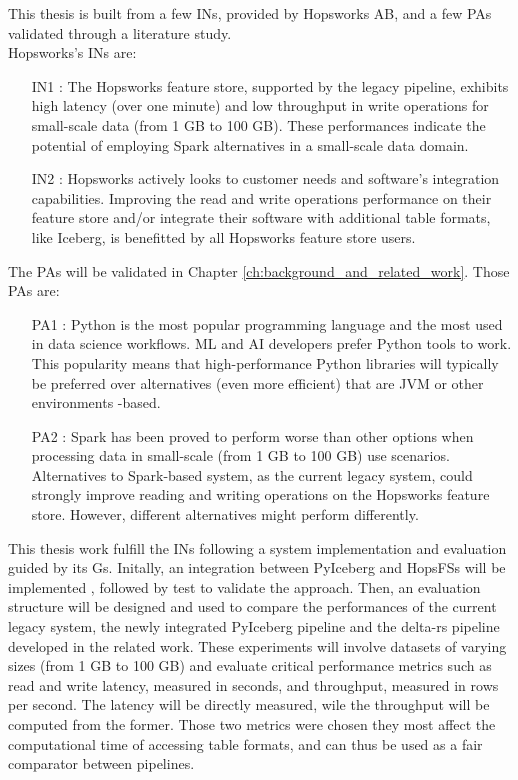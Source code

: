 This thesis is built from a few \glspl{IN}, provided by Hopsworks AB, and a few \glspl{PA} validated through a literature study. \\ Hopsworks's \glspl{IN} are:
\begin{itemize}
    \item[IN1 :] The Hopsworks feature store, supported by the legacy pipeline, exhibits high latency (over one minute) and low throughput in write operations for small-scale data (from 1 GB to 100 GB). These performances indicate the potential of employing Spark alternatives in a small-scale data domain.
    \item[IN2 :] Hopsworks actively looks to customer needs and software's integration capabilities. Improving the read and write operations performance on their feature store and/or integrate their software with additional table formats, like Iceberg, is benefitted by all Hopsworks feature store users.
\end{itemize}
The \glspl{PA} will be validated in Chapter \ref{ch:background_and_related_work}. Those \glspl{PA} are: 
\begin{itemize}
    \item[PA1 :] Python is the most popular programming language and the most used in data science workflows. \gls{ML} and \gls{AI} developers prefer Python tools to work. This popularity means that high-performance Python libraries will typically be preferred over alternatives (even more efficient) that are \gls{JVM} or other environments -based.
    \item[PA2 :] Spark has been proved to perform worse than other options when processing data in small-scale (from 1 GB to 100 GB) use scenarios. Alternatives to Spark-based system, as the current legacy system, could strongly improve reading and writing operations on the Hopsworks feature store. However, different alternatives might perform differently.
\end{itemize}

This thesis work fulfill the \glspl{IN} following a system implementation and evaluation guided by its \glspl{G}. Initally, an integration between PyIceberg and \glspl{HopsFS} will be implemented \cite{niaziHopsFSScalingHierarchical2017}, followed by test to validate the approach. Then, an evaluation structure will be designed and used to compare the performances of the current legacy system, the newly integrated PyIceberg pipeline and the delta-rs pipeline developed in the related work. These experiments will involve datasets of varying sizes (from 1 GB to 100 GB) and evaluate critical performance metrics such as read and write latency, measured in seconds, and throughput, measured in rows per second. The latency will be directly measured, wile the throughput will be computed from the former. Those two metrics were chosen they most affect the computational time of accessing table formats, and can thus be used as a fair comparator between pipelines.